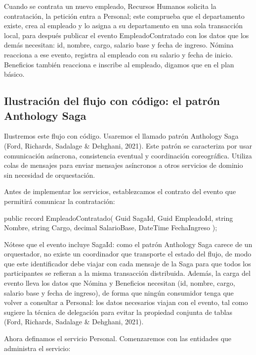 \documentclass[12pt, a4paper]{article}
\begin{document}
    Cuando se contrata un nuevo empleado, Recursos Humanos solicita la contratación, la petición entra a Personal; este comprueba que el departamento existe, crea al empleado y lo asigna a su departamento en una sola transacción local, para después publicar el evento EmpleadoContratado con los datos que los demás necesitan: id, nombre, cargo, salario base y fecha de ingreso. Nómina reacciona a ese evento, registra al empleado con su salario y fecha de inicio. Beneficios también reacciona e inscribe al empleado, digamos que en el plan básico.

    \subsection{Ilustración del flujo con código: el patrón Anthology Saga}

    Ilustremos este flujo con código. Usaremos el llamado patrón Anthology Saga (Ford, Richards, Sadalage \& Dehghani, 2021). Este patrón se caracteriza por usar comunicación asíncrona, consistencia eventual y coordinación coreográfica. Utiliza colas de mensajes para enviar mensajes asíncronos a otros servicios de dominio sin necesidad de orquestación.

    Antes de implementar los servicios, establezcamos el contrato del evento que permitirá comunicar la contratación:

    \begin{csharpbox}
public record EmpleadoContratado(
    Guid SagaId,
    Guid EmpleadoId,
    string Nombre,
    string Cargo,
    decimal SalarioBase,
    DateTime FechaIngreso
);
    \end{csharpbox}

    Nótese que el evento incluye SagaId: como el patrón Anthology Saga carece de un orquestador, no existe un coordinador que transporte el estado del flujo, de modo que este identificador debe viajar con cada mensaje de la Saga para que todos los participantes se refieran a la misma transacción distribuida. Además, la carga del evento lleva los datos que Nómina y Beneficios necesitan (id, nombre, cargo, salario base y fecha de ingreso), de forma que ningún consumidor tenga que volver a consultar a Personal: los datos necesarios viajan con el evento, tal como sugiere la técnica de delegación para evitar la propiedad conjunta de tablas (Ford, Richards, Sadalage \& Dehghani, 2021).

    Ahora definamos el servicio Personal. Comenzaremos con las entidades que administra el servicio:
\end{document}
